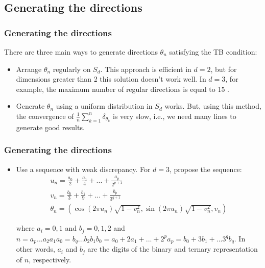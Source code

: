 \documentclass{beamer}
\begin{document}
\subsection{Generating the directions}

\begin{frame}
\frametitle{Generating the directions}
There are three main ways to generate directions $\theta_n$ satisfying the TB condition:
\begin{itemize}
 \item Arrange $\theta_n$ regularly on $S_d$. This approach is efficient in $d=2$, but for dimensions greater than 2
 this solution doesn't work well. In $d=3$, for example, the maximum number of regular directions is equal to 15 \cite{l2002}.
 \item Generate $\theta_n$ using a uniform distribution in $S_d$ works. 
 But, using this method, the convergence of $\frac{1}{n}\sum_{k=1}^{n}\delta_{\theta_k}$
 is very slow, i.e., we need many lines to generate good results.
 \end{itemize}

\end{frame}


\begin{frame}
\frametitle{Generating the directions}
\begin{itemize}
 \item Use a sequence with weak discrepancy. For $d=3$, \cite{f1994} propose the sequence:
 \begin{equation}
 \begin{aligned}
  u_n = \frac{a_0}{2} + \frac{a_1}{4} + ... + \frac{a_p}{2^{p+1}} \\
  v_n = \frac{b_0}{3} + \frac{b_1}{9} + ... + \frac{b_p}{3^{q+1}} \\
  \theta_n = \left( \cos(2\pi u_n) \sqrt{1-v_n^2}, \sin(2\pi u_n) \sqrt{1 - v_n^2}, v_n \right)
  \end{aligned}
 \end{equation}
 
 where $a_i = 0, 1$ and $b_j = 0, 1, 2$ and $n=a_p...a_2a_1a_0=b_q...b_2b_1b_0=a_0 + 2a_1 + ... + 2^pa_p=b_0+3b_1+...3^qb_q$. In other
 words, $a_i$ and $b_j$ are the digits of the binary and ternary representation of $n$, respectively.
\end{itemize}


\end{frame}
\end{document}
